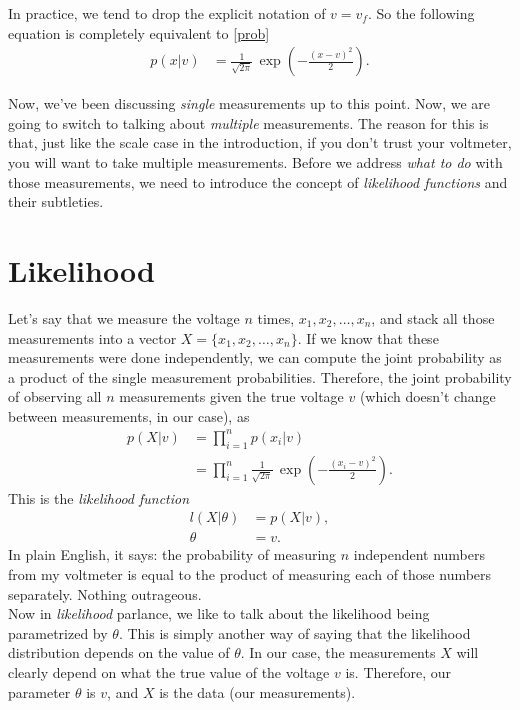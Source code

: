 \documentclass[10pt,letterpaper]{article}
\begin{document}
In practice, we tend to drop the explicit notation of $v=v_f$. So the following equation is completely equivalent to \cref{prob}
\begin{align}
	p(x \vert v) &= \frac{1}{\sqrt{2\pi}}\,\exp\left( -\frac{(x-v)^2}{2} \right).
\end{align}

Now, we've been discussing \emph{single} measurements up to this point. Now, we are going to switch to talking about \emph{multiple} measurements. The reason for this is that, just like the scale case in the introduction, if you don't trust your voltmeter, you will want to take multiple measurements. Before we address \emph{what to do} with those measurements, we need to introduce the concept of \emph{likelihood functions} and their subtleties.\\

\section{Likelihood}

Let's say that we measure the voltage $n$ times, $x_1, x_2, \ldots, x_n$, and stack all those measurements into a vector $X = \{x_1, x_2, \ldots, x_n\}$. If we know that these measurements were done independently, we can compute the joint probability as a product of the single measurement probabilities. Therefore, the joint probability of observing all $n$ measurements given the true voltage $v$ (which doesn't change between measurements, in our case), as
\begin{align}
	p(X\vert v) &= \prod_{i=1}^n p(x_i|v)\\
				&= \prod_{i=1}^n \frac{1}{\sqrt{2\pi}}\,\exp\left( -\frac{(x_i-v)^2}{2} \right).\label{likelihood}
\end{align}
This is the \emph{likelihood function}
\begin{align}
	l(X \vert \theta) &= p(X \vert v),\\
	\theta &= v.
\end{align}
In plain English, it says: the probability of measuring $n$ independent numbers from my voltmeter is equal to the product of measuring each of those numbers separately. Nothing outrageous.\\

Now in \emph{likelihood} parlance, we like to talk about the likelihood being parametrized by $\theta$. This is simply another way of saying that the likelihood distribution depends on the value of $\theta$. In our case, the measurements $X$ will clearly depend on what the true value of the voltage $v$ is. Therefore, our parameter $\theta$ is $v$, and $X$ is the data (our measurements).\\
\end{document}
